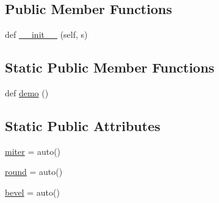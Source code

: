 \subsection*{Public Member Functions}
\begin{DoxyCompactItemize}
\item 
def \hyperlink{classmatplotlib_1_1__enums_1_1JoinStyle_af102e824aea9bbb0d191ac071e2b6bce}{\+\_\+\+\_\+init\+\_\+\+\_\+} (self, s)
\end{DoxyCompactItemize}
\subsection*{Static Public Member Functions}
\begin{DoxyCompactItemize}
\item 
def \hyperlink{classmatplotlib_1_1__enums_1_1JoinStyle_abb85085690b45a6beabb6c5788663e4e}{demo} ()
\end{DoxyCompactItemize}
\subsection*{Static Public Attributes}
\begin{DoxyCompactItemize}
\item 
\hyperlink{classmatplotlib_1_1__enums_1_1JoinStyle_a2b3da424eeb2efb821076cee583d5eaf}{miter} = auto()
\item 
\hyperlink{classmatplotlib_1_1__enums_1_1JoinStyle_aa57b67a1229a1cddb4c06ad3c1f03931}{round} = auto()
\item 
\hyperlink{classmatplotlib_1_1__enums_1_1JoinStyle_afac2620b596cc96cd7bf3a4c48a81af6}{bevel} = auto()
\end{DoxyCompactItemize}


